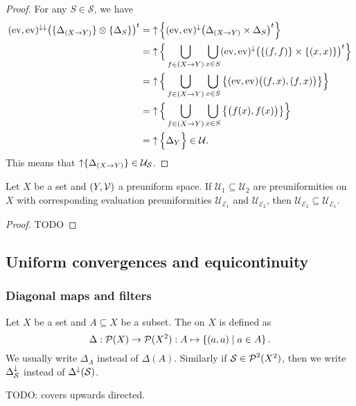 \begin{proof}
For any $S\in \mathcal{S}$, we have
\begin{align*}
(\operatorname{ev}, \operatorname{ev})^{\downarrow\downarrow}\big(\{\Delta_{(X\to Y)}\}\otimes \{\Delta_S\}\big)^t &= \operatorname{\uparrow} \Big\{ (\operatorname{ev}, \operatorname{ev})^{\downarrow}\big(\Delta_{(X\to Y)}\times \Delta_S\big)^t \Big\} \\
&= \operatorname{\uparrow} \Big\{ \bigcup_{f\in (X\to Y)}\bigcup_{x\in S}(\operatorname{ev}, \operatorname{ev})^{\downarrow}\big(\{(f,f)\}\times \{(x,x)\}\big)^t \Big\} \\
&= \operatorname{\uparrow} \Big\{ \bigcup_{f\in (X\to Y)}\bigcup_{x\in S}\big\{(\operatorname{ev}, \operatorname{ev})\big((f,x),(f,x)\big)\big\} \Big\} \\
&= \operatorname{\uparrow} \Big\{ \bigcup_{f\in (X\to Y)}\bigcup_{x\in S}\big\{\big(f(x), f(x)\big)\big\} \Big\} \\
&= \operatorname{\uparrow} \Big\{ \Delta_{Y} \Big\} \in \mathcal{U}.
\end{align*}
This means that $\operatorname{\uparrow} \{\Delta_{(X\to Y)}\} \in \mathcal{U}_\mathcal{S}$.
\end{proof}


\begin{lemma}
Let $X$ be a set and $\left( Y,\mathcal{V} \right)$ a preuniform space. If $\mathcal{U}_1 \subseteq \mathcal{U}_2$ are preuniformities on $X$ with corresponding evaluation preuniformities $\mathcal{U}_{\mathcal{E}_1}$ and $\mathcal{U}_{\mathcal{E}_2}$, then $\mathcal{U}_{\mathcal{E}_2} \subseteq \mathcal{U}_{\mathcal{E}_1}$.
\end{lemma}
\begin{proof}
TODO
\end{proof}

\subsection{Uniform convergences and equicontinuity}
\subsubsection{Diagonal maps and filters}
\begin{definition}
Let $X$ be a set and $A\subseteq X$ be a subset. The  on $X$ is defined as
\[ \Delta: \operatorname{\mathcal{P}}(X)\to \operatorname{\mathcal{P}}(X^2): A\mapsto \left\{ (a,a) \;\middle|\; a\in A \right\}. \]
We usually write $\Delta_A$ instead of $\Delta(A)$. Similarly if $\mathcal{S}\in\operatorname{\mathcal{P}}^2(X^2)$, then we write $\Delta^\downarrow_\mathcal{S}$ instead of $\Delta^\downarrow(\mathcal{S})$.
\end{definition}

TODO: covers upwards directed.

